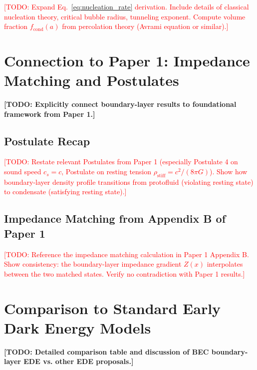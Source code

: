 \documentclass[11pt,a4paper]{article}
\newcommand{\rhostiff}{\ensuremath{\rho_{\mathrm{stiff}}}}
\theoremstyle{definition}
\theoremstyle{remark}
\begin{document}
\textcolor{red}{[TODO: Expand Eq.~\ref{eq:nucleation_rate} derivation. Include details of classical nucleation theory, critical bubble radius, tunneling exponent. Compute volume fraction $f_{\mathrm{cond}}(a)$ from percolation theory (Avrami equation or similar).]}

\section{Connection to Paper 1: Impedance Matching and Postulates}
\label{app:paper1}

\textbf{[TODO: Explicitly connect boundary-layer results to foundational framework from Paper 1.]}

\subsection{Postulate Recap}
\label{app:postulates}

\textcolor{red}{[TODO: Restate relevant Postulates from Paper 1 (especially Postulate 4 on sound speed $c_s = c$, Postulate on resting tension $\rhostiff = c^2/(8\pi G)$). Show how boundary-layer density profile transitions from protofluid (violating resting state) to condensate (satisfying resting state).]}

\subsection{Impedance Matching from Appendix B of Paper 1}
\label{app:impedance_paper1}

\textcolor{red}{[TODO: Reference the impedance matching calculation in Paper 1 Appendix B. Show consistency: the boundary-layer impedance gradient $Z(x)$ interpolates between the two matched states. Verify no contradiction with Paper 1 results.]}

\section{Comparison to Standard Early Dark Energy Models}
\label{app:ede_comparison}

\textbf{[TODO: Detailed comparison table and discussion of BEC boundary-layer EDE vs. other EDE proposals.]}
\end{document}
